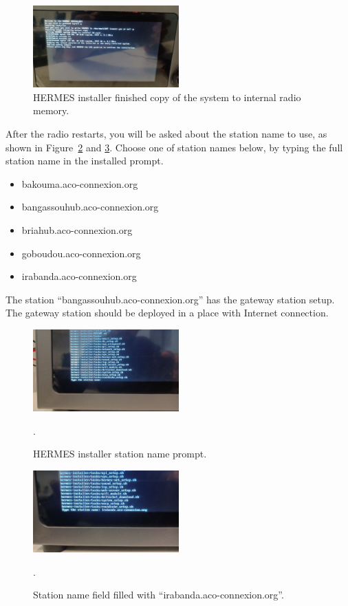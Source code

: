\documentclass[11pt,a4paper]{article}
\begin{document}
\begin{figure}[H]
  \centering
  \includegraphics[width=0.5\textwidth]{pictures/inst-4.jpg}
  \caption{HERMES installer finished copy of the system to internal radio memory.}
  \label{fig:inst4}
\end{figure}


After the radio restarts, you will be asked about the station name to use, as shown in Figure~\ref{fig:inst5} and \ref{fig:inst6}. Choose one of station
names below, by typing the full station name in the installed prompt.
\begin{itemize}
\item bakouma.aco-connexion.org
\item bangassouhub.aco-connexion.org
\item briahub.aco-connexion.org
\item goboudou.aco-connexion.org
\item irabanda.aco-connexion.org
\end{itemize}

The station ``bangassouhub.aco-connexion.org'' has the gateway station setup. The gateway station should be deployed
in a place with Internet connection.

\begin{figure}[H]
  \centering
  \includegraphics[width=0.5\textwidth]{pictures/inst-5.jpg}
  \caption{HERMES installer station name prompt.}.
  \label{fig:inst5}
\end{figure}

\begin{figure}[H]
  \centering
  \includegraphics[width=0.5\textwidth]{pictures/inst-6.jpg}
  \caption{Station name field filled with ``irabanda.aco-connexion.org''.}.
  \label{fig:inst6}
\end{figure}
\end{document}
